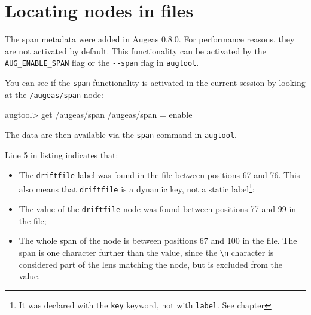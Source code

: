 \section{Locating nodes in files}

\label{sec:locating_nodes}  

The span metadata were added in Augeas 0.8.0. For performance reasons, they are not activated by default. This functionality can be activated by the \verb!AUG_ENABLE_SPAN! flag or the \verb!--span! flag in \verb!augtool!.

You can see if the \verb!span! functionality is activated in the current session by looking at the \texttt{/augeas/span} node:


\begin{augtoolsh}[]
augtool> get /augeas/span
/augeas/span = enable
\end{augtoolsh}

The data are then available via the \verb!span! command in \verb!augtool!.



Line 5 in listing  indicates that:

\begin{itemize}
\item
  The \verb!driftfile! label was found in the file between positions 67 and 76. This also means that \verb!driftfile! is a dynamic key, not a static label\footnote{It was declared with the \verb!key! keyword, not with \verb!label!. See chapter };
\item
  The value of the \verb!driftfile! node was found between positions 77 and 99 in the file;
\item
  The whole span of the node is between positions 67 and 100 in the file. The span is one character further than the value, since the \verb!\n! character is considered part of the lens matching the node, but is excluded from the value.
\end{itemize}

